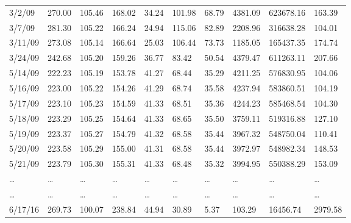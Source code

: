 \documentclass[english]{article}
\begin{document}
\begin{appendices}
\begin{table}[H]
\begin{tabular}{@{}llllllllll@{}}
3/2/09        & 270.00       & 105.46       & 168.02      & 34.24           & 101.98       & 68.79        & 4381.09      & 623678.16    & 163.39       \\
3/7/09        & 281.30       & 105.22       & 166.24      & 24.94           & 115.06       & 82.89        & 2208.96      & 316638.28    & 104.01       \\
3/11/09       & 273.08       & 105.14       & 166.64      & 25.03           & 106.44       & 73.73        & 1185.05      & 165437.35    & 174.74       \\
3/24/09       & 242.68       & 105.20       & 159.26      & 36.77           & 83.42        & 50.54        & 4379.47      & 611263.11    & 207.66       \\
5/14/09       & 222.23       & 105.19       & 153.78      & 41.27           & 68.44        & 35.29        & 4211.25      & 576830.95    & 104.06       \\
5/16/09       & 223.00       & 105.22       & 154.26      & 41.29           & 68.74        & 35.58        & 4237.94      & 583860.51    & 104.19       \\
5/17/09       & 223.10       & 105.23       & 154.59      & 41.33           & 68.51        & 35.36        & 4244.23      & 585468.54    & 104.30       \\
5/18/09       & 223.29       & 105.25       & 154.64      & 41.33           & 68.65        & 35.50        & 3759.11      & 519316.88    & 127.10       \\
5/19/09       & 223.37       & 105.27       & 154.79      & 41.32           & 68.58        & 35.44        & 3967.32      & 548750.04    & 110.41       \\
5/20/09       & 223.58       & 105.29       & 155.00      & 41.31           & 68.58        & 35.44        & 3972.97      & 548982.34    & 148.53       \\
5/21/09       & 223.79       & 105.30       & 155.31      & 41.33           & 68.48        & 35.32        & 3994.95      & 550388.29    & 153.09       \\
…             & …            & …            & …           & …               & …            & …            & …            & …            & …            \\
…             & …            & …            & …           & …               & …            & …            & …            & …            & …            \\
6/17/16       & 269.73       & 100.07       & 238.84      & 44.94           & 30.89        & 5.37         & 103.29       & 16456.74     & 2979.58      \\

\end{tabular}
\end{table}
\end{appendices}
\end{document}
